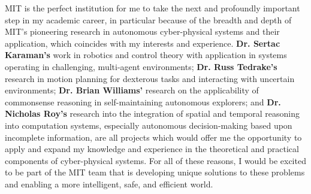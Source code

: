 \documentclass[11pt]{letter}
\begin{document}
MIT is the perfect institution for me to take the next and profoundly important step in my academic career, in particular because of the breadth and depth of MIT’s pioneering research in autonomous cyber-physical systems and their application, which coincides with my interests and experience.  \textbf{Dr. Sertac Karaman’s} work in robotics and control theory with application in systems operating in challenging, multi-agent environments; \textbf{Dr. Russ Tedrake's} research in motion planning for dexterous tasks and interacting with uncertain environments; \textbf{Dr. Brian Williams’} research on the applicability of commonsense reasoning in self-maintaining autonomous explorers; and \textbf{Dr. Nicholas Roy’s} research into the integration of spatial and temporal reasoning into computation systems, especially autonomous decision-making based upon incomplete information, are all projects which would offer me the opportunity to apply and expand my knowledge and experience in the theoretical and practical components of cyber-physical systems.  For all of these reasons, I would be excited to be part of the MIT team that is developing unique solutions to these problems and enabling a more intelligent, safe, and efficient world.

\begin{comment}
{\bf \emph{References}}

[1] "Cyber-Physical Systems." Baheti and Gill

[2] "Optimization and Control of Cyber-Physical Vehicle Systems." Bradley and Atkins

\end{comment}
\end{document}
